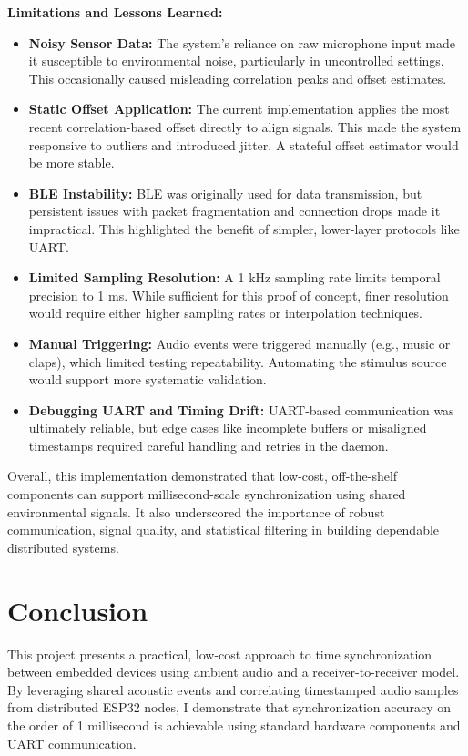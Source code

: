 \documentclass[sigconf]{acmart}
\begin{document}
\textbf{Limitations and Lessons Learned:}
\begin{itemize}
    \item \textbf{Noisy Sensor Data:} The system’s reliance on raw microphone input made it susceptible to environmental noise, particularly in uncontrolled settings. This occasionally caused misleading correlation peaks and offset estimates.
    \item \textbf{Static Offset Application:} The current implementation applies the most recent correlation-based offset directly to align signals. This made the system responsive to outliers and introduced jitter. A stateful offset estimator would be more stable.
    \item \textbf{BLE Instability:} BLE was originally used for data transmission, but persistent issues with packet fragmentation and connection drops made it impractical. This highlighted the benefit of simpler, lower-layer protocols like UART.
    \item \textbf{Limited Sampling Resolution:} A 1 kHz sampling rate limits temporal precision to 1 ms. While sufficient for this proof of concept, finer resolution would require either higher sampling rates or interpolation techniques.
    \item \textbf{Manual Triggering:} Audio events were triggered manually (e.g., music or claps), which limited testing repeatability. Automating the stimulus source would support more systematic validation.
    \item \textbf{Debugging UART and Timing Drift:} UART-based communication was ultimately reliable, but edge cases like incomplete buffers or misaligned timestamps required careful handling and retries in the daemon.
\end{itemize}

Overall, this implementation demonstrated that low-cost, off-the-shelf components can support millisecond-scale synchronization using shared environmental signals. It also underscored the importance of robust communication, signal quality, and statistical filtering in building dependable distributed systems.


\section{Conclusion}

This project presents a practical, low-cost approach to time synchronization between embedded devices using ambient audio and a receiver-to-receiver model. By leveraging shared acoustic events and correlating timestamped audio samples from distributed ESP32 nodes, I demonstrate that synchronization accuracy on the order of 1 millisecond is achievable using standard hardware components and UART communication.
\end{document}
